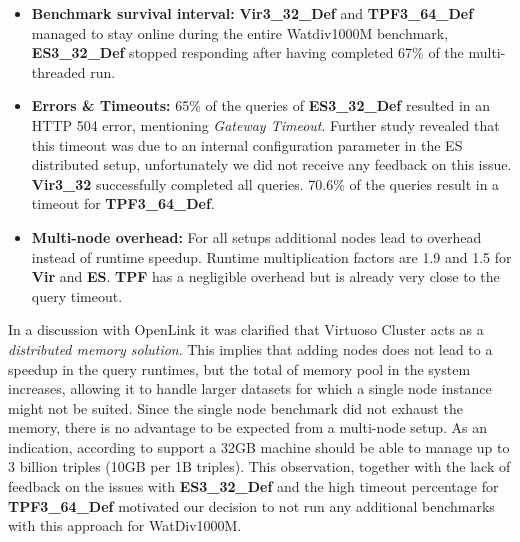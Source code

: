 \begin{itemize}
	\item \textbf{Benchmark survival interval:} %
	\textbf{Vir3\_32\_Def} and \textbf{TPF3\_64\_Def} managed to stay online during the entire Watdiv1000M benchmark, \\ \textbf{ES3\_32\_Def} stopped responding after having completed 67\% of the multi-threaded run. 
	\item \textbf{Errors \& Timeouts:} 65\% of the queries of \textbf{ES3\_32\_Def} resulted in an HTTP 504 error, mentioning \textit{Gateway Timeout}. Further study revealed that this timeout was due to an internal configuration parameter in the ES distributed setup, unfortunately we did not receive any feedback on this issue. \textbf{Vir3\_32} successfully completed all queries. 70.6\% of the queries result in a timeout for \textbf{TPF3\_64\_Def}.
	\item \textbf{Multi-node overhead:} For all setups additional nodes lead to overhead instead of runtime speedup. Runtime multiplication factors are 1.9 and 1.5 for \textbf{Vir} and \textbf{ES}. \textbf{TPF} has a negligible overhead but is already very close to the query timeout.
\end{itemize}
%
%   

In a discussion with OpenLink it was clarified that Virtuoso Cluster acts as a \emph{distributed memory solution}. This implies that adding nodes does not lead to a speedup in the query runtimes, but the total of memory pool in the system increases, allowing it to handle larger datasets for which a single node instance might not be suited. Since the single node benchmark did not exhaust the memory, there is no advantage to be expected from a multi-node setup. As an indication, according to support a 32GB machine should be able to manage up to 3 billion triples (10GB per 1B triples). 
This observation, together with the lack of feedback on the issues with \textbf{ES3\_32\_Def} and the high timeout percentage for \textbf{TPF3\_64\_Def} motivated our decision to not run any additional benchmarks with this approach for WatDiv1000M.

